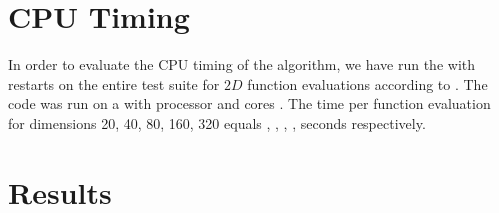 \documentclass[sigconf]{acmart}
\begin{document}




\maketitle


%
%
%

\section{CPU Timing}
In order to evaluate the CPU timing of the algorithm, we have run the \change{\algorithmA} with restarts on the entire \bbobls test suite \cite{varelas2020benchmarking} for $2 D$ function evaluations according to \cite{hansen2016exp}. The  code was run on a  with  processor and  cores . The time per function evaluation for dimensions 20, 40, 80, 160, 320 equals , , , ,  seconds respectively. 


\section{Results}
\end{document}
